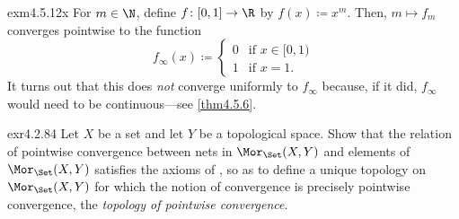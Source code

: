 \begin{exm}{}{exm4.5.12x}
For $m\in \N$, define $f\colon [0,1]\rightarrow \R$ by $f(x)\coloneqq x^m$.  Then, $m\mapsto f_m$ converges pointwise to the function
\begin{equation}
f_{\infty}(x)\coloneqq \begin{cases}0 & \text{if }x\in [0,1) \\ 1 & \text{if }x=1.\end{cases}
\end{equation}
It turns out that this does \emph{not} converge uniformly to $f_{\infty}$ because, if it did, $f_{\infty}$ would need to be continuous---see \cref{thm4.5.6}.
\end{exm}
\begin{exr}{}{exr4.2.84}
Let $X$ be a set and let $Y$ be a topological space.  Show that the relation of pointwise convergence between nets in $\Mor _{\Set}(X,Y)$ and elements of $\Mor _{\Set}(X,Y)$ satisfies the axioms of , so as to define a unique topology on $\Mor _{\Set}(X,Y)$ for which the notion of convergence is precisely pointwise convergence, the \emph{topology of pointwise convergence}.
\end{exr}

